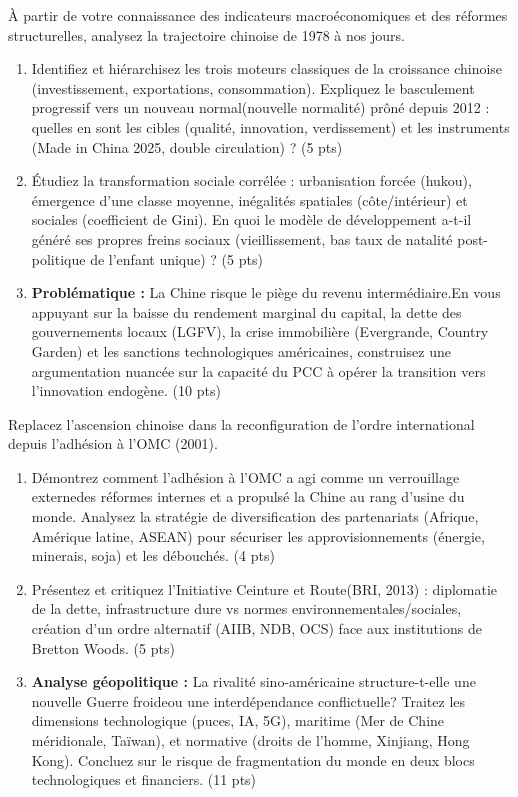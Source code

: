 \documentclass[11pt]{article}
\begin{document}
\begin{exercice}
À partir de votre connaissance des indicateurs macroéconomiques et des réformes structurelles, analysez la trajectoire chinoise de 1978 à nos jours.
\begin{enumerate}
    \item Identifiez et hiérarchisez les trois moteurs classiques de la croissance chinoise (investissement, exportations, consommation). Expliquez le basculement progressif vers un \og nouveau normal\fg (nouvelle normalité) prôné depuis 2012 : quelles en sont les cibles (qualité, innovation, verdissement) et les instruments (\og Made in China 2025\fg, double circulation) ? (5 pts)
    \item Étudiez la transformation sociale corrélée : urbanisation forcée (\og hukou\fg), émergence d'une classe moyenne, inégalités spatiales (côte/intérieur) et sociales (coefficient de Gini). En quoi le modèle de développement a-t-il généré ses propres freins sociaux (vieillissement, bas taux de natalité post-politique de l'enfant unique) ? (5 pts)
    \item \textbf{Problématique :} \og La Chine risque le piège du revenu intermédiaire.\fg En vous appuyant sur la baisse du rendement marginal du capital, la dette des gouvernements locaux (LGFV), la crise immobilière (Evergrande, Country Garden) et les sanctions technologiques américaines, construisez une argumentation nuancée sur la capacité du PCC à opérer la transition vers l'innovation endogène. (10 pts)
\end{enumerate}
\end{exercice}

\begin{exercice}
Replacez l'ascension chinoise dans la reconfiguration de l'ordre international depuis l'adhésion à l'OMC (2001).
\begin{enumerate}
    \item Démontrez comment l'adhésion à l'OMC a agi comme un \og verrouillage externe\fg des réformes internes et a propulsé la Chine au rang d'\og usine du monde\fg. Analysez la stratégie de diversification des partenariats (Afrique, Amérique latine, ASEAN) pour sécuriser les approvisionnements (énergie, minerais, soja) et les débouchés. (4 pts)
    \item Présentez et critiquez l'Initiative \og Ceinture et Route\fg (BRI, 2013) : diplomatie de la dette, infrastructure dure vs normes environnementales/sociales, création d'un ordre alternatif (AIIB, NDB, OCS) face aux institutions de Bretton Woods. (5 pts)
    \item \textbf{Analyse géopolitique :} La rivalité sino-américaine structure-t-elle une \og nouvelle Guerre froide\fg ou une \og interdépendance conflictuelle\fg ? Traitez les dimensions technologique (puces, IA, 5G), maritime (Mer de Chine méridionale, Taïwan), et normative (droits de l'homme, Xinjiang, Hong Kong). Concluez sur le risque de fragmentation du monde en deux blocs technologiques et financiers. (11 pts)
\end{enumerate}
\end{exercice}
\end{document}
